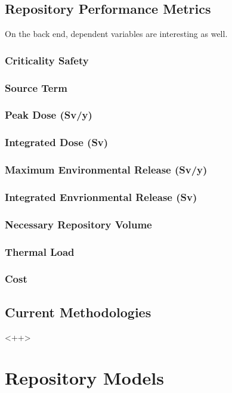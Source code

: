 \subsection{Repository Performance Metrics}
On the back end, dependent variables are interesting as well.  \subsubsection{Criticality Safety}
\subsubsection{Source Term}
\subsubsection{Peak Dose (Sv/y)}
\subsubsection{Integrated Dose (Sv)}
\subsubsection{Maximum Environmental Release (Sv/y)}
\subsubsection{Integrated Envrionmental Release (Sv)}
\subsubsection{Necessary Repository Volume}
\subsubsection{Thermal Load}
\subsubsection{Cost}
\subsection{Current Methodologies}<++>

\section{Repository Models}
